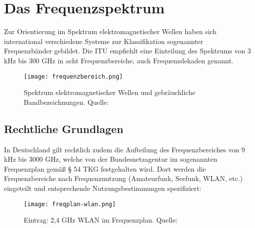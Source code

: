 


\newpage
\section{Das Frequenzspektrum}
\label{section-frequenzbereiche}
Zur Orientierung im Spektrum elektromagnetischer Wellen haben sich international verschiedene Systeme zur Klassifikation sogenannter Frequenzbänder gebildet. Die \ac{ITU} empfiehlt eine Einteilung des Spektrums von 3 kHz bis 300 GHz in acht Frequenzbereiche, auch Frequenzdekaden genannt. \cite[vgl. ITU-R v.431-8]{itu-431:2015}

\begin{figure}[ht]
	\centering
	\texttt{[image: frequenzbereich.png]}
	\caption[Spektrum elektromagnetischer Wellen und gebräuchliche Bandbezeichnungen]{Spektrum elektromagnetischer Wellen und gebräuchliche Bandbezeichnungen. Quelle: \cite[Kark, S. 1]{Kark:2017}} 
	\label{frequenzbereiche}
\end{figure}






\subsection{Rechtliche Grundlagen} %
In Deutschland gilt rechtlich zudem die Aufteilung des Frequenzbereiches von 9 kHz bis 3000 GHz, welche von der Bundesnetzagentur im sogenannten Frequenzplan \cite[Bundesnetzagentur, 2016]{bundesnetzagentur-frequenzplan:2016} gemäß § 54 TKG festgehalten wird.
Dort werden die Frequenzbereiche nach Frequenznutzung (Amateurfunk, Seefunk, WLAN, etc.) eingeteilt und entsprechende Nutzungsbestimmungen spezifiziert:

\begin{figure}[ht]
	\centering
	\texttt{[image: freqplan-wlan.png]}
	\caption[Eintrag: 2,4 GHz WLAN im Frequenzplan]{Eintrag: 2,4 GHz WLAN im Frequenzplan. Quelle: \cite[Bundesnetzagentur, 2016]{bundesnetzagentur-frequenzplan:2016}}
	\label{frequenzplan-wlan}
\end{figure}


